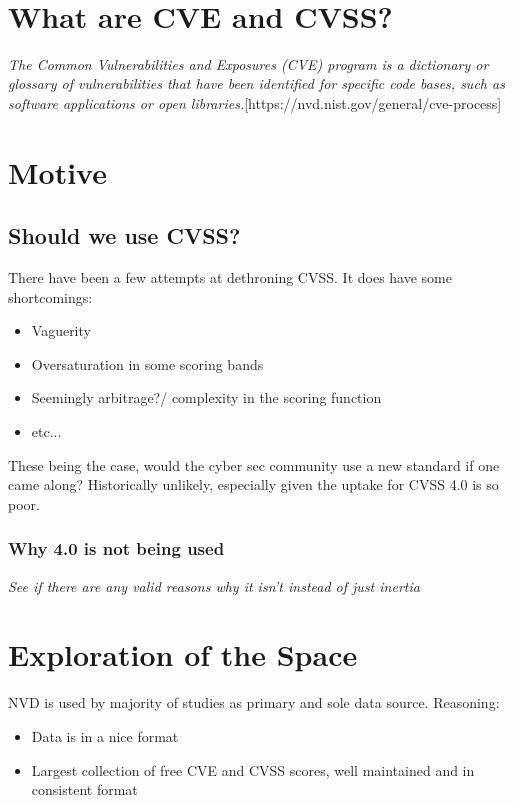 \documentclass[11pt]{article}
\begin{document}
 \\

\section{What are CVE and CVSS?}

\textit{The Common Vulnerabilities and Exposures (CVE) program is a dictionary or glossary of
	vulnerabilities that have been identified for specific code bases, such as software applications or
	open libraries.}[https://nvd.nist.gov/general/cve-process]

\section{Motive}
\subsection{Should we use CVSS?}

There have been a few attempts at dethroning CVSS. It does have some shortcomings:

\begin{itemize}
	\item Vaguerity
	\item Oversaturation in some scoring bands
	\item Seemingly arbitrage?/ complexity in the scoring function
	\item etc...
\end{itemize}

These being the case, would the cyber sec community use a new standard if one came along?
Historically unlikely, especially given the uptake for CVSS 4.0 is so poor.

\subsubsection{Why 4.0 is not being used}
\textit{See if there are any valid reasons why it isn't instead of just inertia}
\section{Exploration of the Space}

NVD is used by majority of studies as primary and sole data source.
Reasoning:
\begin{itemize}
	\item Data is in a nice format
	\item Largest collection of free CVE and CVSS scores, well maintained and in consistent format
\end{itemize}
\end{document}
